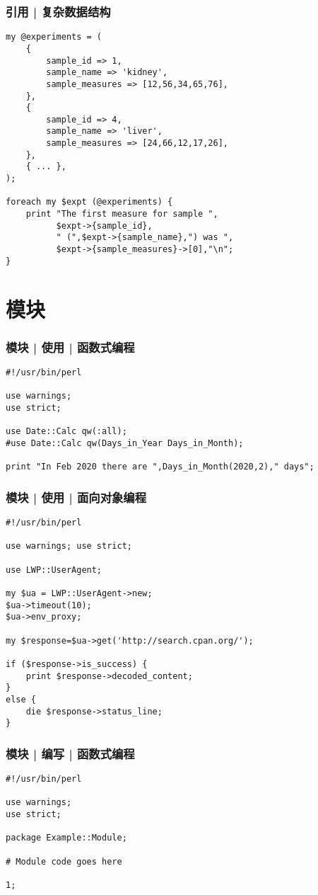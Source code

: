 \begin{frame}[fragile]
  \frametitle{引用 | 复杂数据结构}
\begin{lstlisting}[basicstyle=\footnotesize\tt,numberstyle=\scriptsize]
my @experiments = (
    {
        sample_id => 1,
        sample_name => 'kidney',
        sample_measures => [12,56,34,65,76],
    },
    {
        sample_id => 4,
        sample_name => 'liver',
        sample_measures => [24,66,12,17,26],
    },
    { ... },
);

foreach my $expt (@experiments) {
    print "The first measure for sample ",
          $expt->{sample_id},
          " (",$expt->{sample_name},") was ",
          $expt->{sample_measures}->[0],"\n";
}
\end{lstlisting}
\end{frame}

\section{模块}
\begin{frame}[fragile]
  \frametitle{模块 | 使用 | 函数式编程}
\begin{lstlisting}
#!/usr/bin/perl

use warnings;
use strict;

use Date::Calc qw(:all);
#use Date::Calc qw(Days_in_Year Days_in_Month);

print "In Feb 2020 there are ",Days_in_Month(2020,2)," days";
\end{lstlisting}
\end{frame}

\begin{frame}[fragile]
  \frametitle{模块 | 使用 | 面向对象编程}
  \begin{lstlisting}[basicstyle=\small\tt]
#!/usr/bin/perl

use warnings; use strict;

use LWP::UserAgent;
 
my $ua = LWP::UserAgent->new;
$ua->timeout(10);
$ua->env_proxy;
 
my $response=$ua->get('http://search.cpan.org/');
 
if ($response->is_success) {
    print $response->decoded_content;
}
else {
    die $response->status_line;
}
\end{lstlisting}
\end{frame}

\begin{frame}[fragile]
  \frametitle{模块 | 编写 | 函数式编程}
\begin{lstlisting}
#!/usr/bin/perl

use warnings;
use strict;

package Example::Module;

# Module code goes here

1;
\end{lstlisting}
\end{frame}

